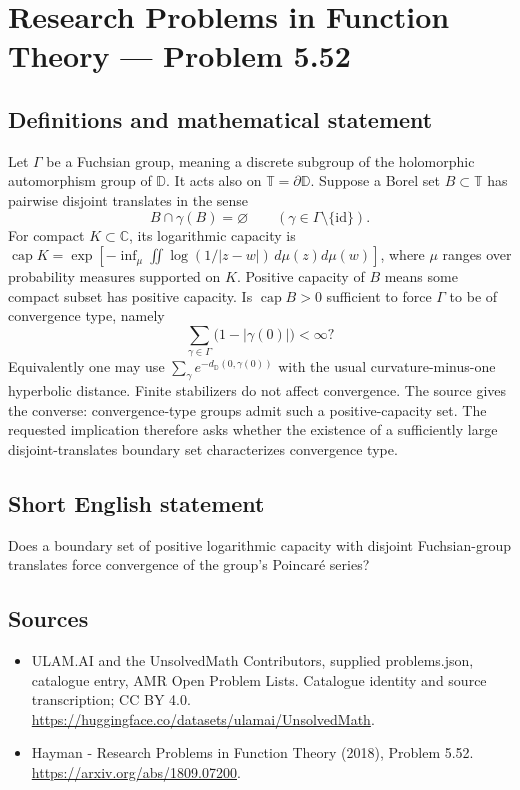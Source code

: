 \documentclass[11pt,a4paper]{article}
\begin{document}
\section*{Research Problems in Function Theory — Problem 5.52}\label{statement}

\subsection{Definitions and mathematical statement}
Let $\Gamma$ be a Fuchsian group, meaning a discrete subgroup of the holomorphic automorphism group of $\mathbb D$. It acts also on $\mathbb T=\partial\mathbb D$. Suppose a Borel set $B\subset\mathbb T$ has pairwise disjoint translates in the sense
\[
B\cap\gamma(B)=\varnothing\qquad
(\gamma\in\Gamma\setminus\{\mathrm{id}\}).
\]
For compact $K\subset\mathbb C$, its logarithmic capacity is
$\operatorname{cap}K=\exp[-\inf_\mu\iint\log(1/|z-w|)\,d\mu(z)d\mu(w)]$, where $\mu$ ranges over probability measures supported on $K$. Positive capacity of $B$ means some compact subset has positive capacity.
Is $\operatorname{cap}B>0$ sufficient to force $\Gamma$ to be of convergence type, namely
\[
\sum_{\gamma\in\Gamma}\bigl(1-|\gamma(0)|\bigr)<\infty?
\]
Equivalently one may use $\sum_\gamma e^{-d_{\mathbb D}(0,\gamma(0))}$ with the usual curvature-minus-one hyperbolic distance. Finite stabilizers do not affect convergence. The source gives the converse: convergence-type groups admit such a positive-capacity set. The requested implication therefore asks whether the existence of a sufficiently large disjoint-translates boundary set characterizes convergence type.
\subsection{Short English statement}
Does a boundary set of positive logarithmic capacity with disjoint Fuchsian-group translates force convergence of the group's Poincaré series?
\subsection{Sources}
\begin{itemize}
\item[S1] ULAM.AI and the UnsolvedMath Contributors, supplied problems.json, catalogue entry, AMR Open Problem Lists. Catalogue identity and source transcription; CC BY 4.0.
\url{https://huggingface.co/datasets/ulamai/UnsolvedMath}.
\item[S2] Hayman - Research Problems in Function Theory (2018), Problem 5.52. 
\url{https://arxiv.org/abs/1809.07200}.
\end{itemize}
\end{document}
